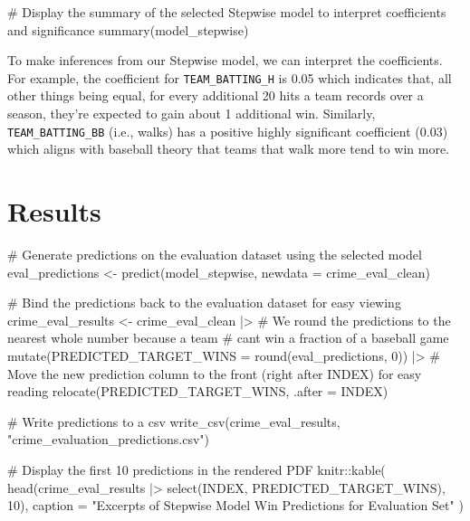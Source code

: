 \documentclass[
  11pt]{article}
\newenvironment{Shaded}{\begin{snugshade}}{\end{snugshade}}
\newcommand{\AttributeTok}[1]{\textcolor[rgb]{0.40,0.45,0.13}{#1}}
\newcommand{\CommentTok}[1]{\textcolor[rgb]{0.37,0.37,0.37}{#1}}
\newcommand{\DecValTok}[1]{\textcolor[rgb]{0.68,0.00,0.00}{#1}}
\newcommand{\FunctionTok}[1]{\textcolor[rgb]{0.28,0.35,0.67}{#1}}
\newcommand{\NormalTok}[1]{\textcolor[rgb]{0.00,0.23,0.31}{#1}}
\newcommand{\OtherTok}[1]{\textcolor[rgb]{0.00,0.23,0.31}{#1}}
\newcommand{\SpecialCharTok}[1]{\textcolor[rgb]{0.37,0.37,0.37}{#1}}
\newcommand{\StringTok}[1]{\textcolor[rgb]{0.13,0.47,0.30}{#1}}
\begin{document}
\begin{Shaded}
\begin{Highlighting}[]
\CommentTok{\# Display the summary of the selected Stepwise model to interpret coefficients and significance}
\FunctionTok{summary}\NormalTok{(model\_stepwise)}
\end{Highlighting}
\end{Shaded}

To make inferences from our Stepwise model, we can interpret the
coefficients. For example, the coefficient for \texttt{TEAM\_BATTING\_H}
is 0.05 which indicates that, all other things being equal, for every
additional 20 hits a team records over a season, they're expected to
gain about 1 additional win. Similarly, \texttt{TEAM\_BATTING\_BB}
(i.e., walks) has a positive highly significant coefficient (0.03) which
aligns with baseball theory that teams that walk more tend to win more.

\section{Results}\label{results}

\begin{Shaded}
\begin{Highlighting}[]
\CommentTok{\# Generate predictions on the evaluation dataset using the selected model}
\NormalTok{eval\_predictions }\OtherTok{\textless{}{-}} \FunctionTok{predict}\NormalTok{(model\_stepwise, }\AttributeTok{newdata =}\NormalTok{ crime\_eval\_clean)}

\CommentTok{\# Bind the predictions back to the evaluation dataset for easy viewing}
\NormalTok{crime\_eval\_results }\OtherTok{\textless{}{-}}\NormalTok{ crime\_eval\_clean }\SpecialCharTok{|\textgreater{}}
  \CommentTok{\# We round the predictions to the nearest whole number because a team }
  \CommentTok{\# can\textquotesingle{}t win a fraction of a baseball game}
  \FunctionTok{mutate}\NormalTok{(}\AttributeTok{PREDICTED\_TARGET\_WINS =} \FunctionTok{round}\NormalTok{(eval\_predictions, }\DecValTok{0}\NormalTok{)) }\SpecialCharTok{|\textgreater{}}
  \CommentTok{\# Move the new prediction column to the front (right after INDEX) for easy reading}
  \FunctionTok{relocate}\NormalTok{(PREDICTED\_TARGET\_WINS, }\AttributeTok{.after =}\NormalTok{ INDEX)}

\CommentTok{\# Write predictions to a csv}
\FunctionTok{write\_csv}\NormalTok{(crime\_eval\_results, }\StringTok{"crime\_evaluation\_predictions.csv"}\NormalTok{)}

\CommentTok{\# Display the first 10 predictions in the rendered PDF}
\NormalTok{knitr}\SpecialCharTok{::}\FunctionTok{kable}\NormalTok{(}
  \FunctionTok{head}\NormalTok{(crime\_eval\_results }\SpecialCharTok{|\textgreater{}} \FunctionTok{select}\NormalTok{(INDEX, PREDICTED\_TARGET\_WINS), }\DecValTok{10}\NormalTok{),}
  \AttributeTok{caption =} \StringTok{"Excerpts of Stepwise Model Win Predictions for Evaluation Set"}
\NormalTok{)}
\end{Highlighting}
\end{Shaded}
\end{document}
